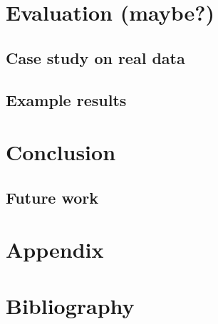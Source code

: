 \documentclass[12pt, a4paper, english]{report}
\begin{document}
\chapter{Evaluation (maybe?)}

\section{Case study on real data}

\section{Example results}

\chapter{Conclusion}

\section{Future work}

\chapter{Appendix}

\chapter{Bibliography}
\end{document}
